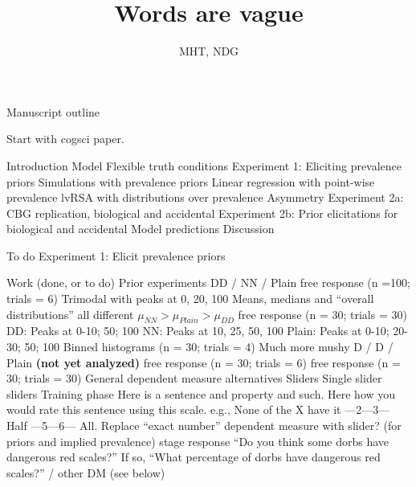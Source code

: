\documentclass{article}
\begin{document}
\title{Words are vague}
\author{MHT, NDG} \maketitle
 
\begin{outline}
  \0 Manuscript outline
  
  Start with cogsci paper.
  
  	\1 Introduction 
	\1 Model
	\1 Flexible truth conditions
		\2 Experiment 1: Eliciting prevalence priors
		\2 Simulations with prevalence priors
			\3 Linear regression with point-wise prevalence
			\3 lvRSA with distributions over prevalence
	\1 Asymmetry
		\2 Experiment 2a: CBG replication, biological and accidental
		\2 Experiment 2b: Prior elicitations for biological and accidental
		\2 Model predictions
	\1 Discussion
		

\vspace{2cm}
	\0 To do
		\1 Experiment 1: Elicit prevalence priors


	
\vspace{2cm}
	\0 Work (done, or to do)
		\1 Prior experiments
			\2 DD / NN / Plain
				 free response (n =100; trials = 6)
					\4 Trimodal with peaks at 0, 20, 100
					\4 Means, medians and ``overall distributions'' all different
					\4$ \mu_{NN} > \mu_{Plain} > \mu_{DD} $
				 free response (n = 30; trials = 30)
					\4 DD: Peaks at 0-10; 50; 100
					\4 NN: Peaks at 10, 25, 50, 100
					\4 Plain: Peaks at 0-10; 20-30; 50; 100
				\3 Binned histograms (n = 30; trials = 4)
					\4 Much more mushy
			\2 D / D / Plain \textbf{(not yet analyzed)}
				 free response (n = 30; trials = 6)
				 free response (n = 30; trials = 30)
			\2 General dependent measure alternatives
				\3 Sliders
					\4 Single slider
					\4 5 sliders
				\3 Training phase
					\4 Here is a sentence and property and such.
					\4 Here how you would rate this sentence using this scale.
					\4 e.g., None of the X have it ---2---3--- Half ---5---6--- All.
				\3 Replace ``exact number'' dependent measure with slider? (for priors and implied prevalence)
				 stage response
					\4 ``Do you think some dorbs have dangerous red scales?''
					\4 If so, ``What percentage of dorbs have dangerous red scales?'' / other DM (see below)
					

\end{outline}
\end{document}
